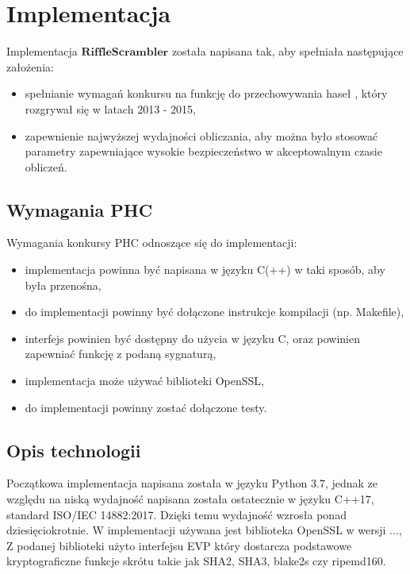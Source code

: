 \chapter{Implementacja}
\thispagestyle{chapterBeginStyle}

Implementacja $\mathbf{RiffleScrambler}$ została napisana tak, aby spełniała następujące założenia:
\begin{itemize}
	\item spełnianie wymagań konkursu na funkcję do przechowywania haseł \cite[PHC, ang \textit{Password Hashing Competition}]{PHC2013}, który rozgrywał się w latach 2013 - 2015,
	
	\item zapewnienie najwyższej wydajności obliczania, aby można było stosować parametry zapewniające wysokie bezpieczeństwo w akceptowalnym czasie obliczeń.
\end{itemize}

\section{Wymagania PHC}
Wymagania konkursy PHC odnoszące się do implementacji:
\begin{itemize}
	\item implementacja powinna być napisana w języku C(++) w taki sposób, aby była przenośna,
	\item do implementacji powinny być dołączone instrukcje kompilacji (np. Makefile),
	\item interfejs powinien być dostępny do użycia w języku C, oraz powinien zapewniać funkcję z podaną sygnaturą,
	\item implementacja może używać biblioteki OpenSSL,
	\item do implementacji powinny zostać dołączone testy.
\end{itemize}




\section{Opis technologii}
Początkowa implementacja napisana została w języku Python 3.7, jednak ze względu na niską wydajność  napisana została ostatecznie w języku C++17, standard ISO/IEC 14882:2017.
Dzięki temu wydajność wzrosła ponad dziesięciokrotnie.
W implementacji używana jest biblioteka OpenSSL w wersji ...,
Z podanej biblioteki użyto interfejsu EVP który dostarcza podstawowe kryptograficzne funkcje skrótu takie jak SHA2, SHA3, blake2s czy ripemd160.


